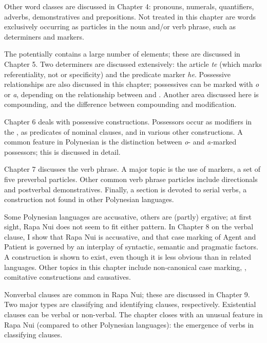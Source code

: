 Other word classes are discussed in Chapter 4: pronouns, numerals, quantifiers, adverbs, demonstratives and prepositions. Not treated in this chapter are words exclusively occurring as particles in the noun and/or verb phrase, such as determiners and  markers.

The  potentially contains a large number of elements; these are discussed in Chapter 5. Two determiners are discussed extensively: the article \textit{te} (which marks referentiality, not  or specificity) and the predicate marker \textit{he}. Possessive relationships are also discussed in this chapter; possessives can be marked with \textit{o} or \textit{a}, depending on the relationship between  and . Another area discussed here is compounding, and the difference between compounding and modification.

Chapter 6 deals with possessive constructions. Possessors occur as modifiers in the , as predicates of nominal clauses, and in various other constructions. A common feature in Polynesian is the distinction between \textit{o}{}- and \textit{a-}marked possessors; this is discussed in detail.

Chapter 7 discusses the verb phrase. A major topic is the use of  markers, a set of five preverbal particles. Other common verb phrase particles include directionals and postverbal demonstratives. Finally, a section is devoted to serial verbs, a construction not found in other Polynesian languages.

Some Polynesian languages are accusative, others are (partly) ergative; at first sight, Rapa Nui does not seem to fit either pattern. In Chapter 8 on the verbal clause, I show that Rapa Nui is accusative, and that case marking of Agent and Patient is governed by an interplay of syntactic, semantic and pragmatic factors. A  construction is shown to exist, even though it is less obvious than in related languages. Other topics in this chapter include non-canonical case marking, , comitative constructions and causatives.

Nonverbal clauses are common in Rapa Nui; these are discussed in Chapter 9. Two major types are classifying and identifying clauses, respectively. Existential clauses can be verbal or non-verbal. The chapter closes with an unusual feature in Rapa Nui (compared to other Polynesian languages): the emergence of  verbs in classifying clauses.

